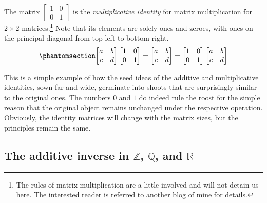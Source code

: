 \documentclass[
  a4paper,
]{article}
\begin{document}
The matrix \(\begin{bmatrix}1 & 0\\0 & 1\end{bmatrix}\) is the
\emph{multiplicative identity} for matrix multiplication for
\(2 \times 2\) matrices.\footnote{The rules of matrix multiplication are
  a little involved and will not detain us here. The interested reader
  is referred to another blog of mine for details.} Note that its
elements are solely ones and zeroes, with ones on the principal-diagonal
from top left to bottom right.
\begin{equation}\phantomsection\label{eq:matmultident}{
\begin{bmatrix}
a & b\\
c & d
\end{bmatrix}
\begin{bmatrix}
1 & 0\\
0 & 1
\end{bmatrix}
= %
\begin{bmatrix}
a & b\\
c & d
\end{bmatrix}
=
\begin{bmatrix}
1 & 0\\
0 & 1
\end{bmatrix}
\begin{bmatrix}
a & b\\
c & d
\end{bmatrix}
}\end{equation}

This is a simple example of how the seed ideas of the additive and
multiplicative identities, sown far and wide, germinate into shoots that
are surprisingly similar to the original ones. The numbers \(0\) and
\(1\) do indeed rule the roost for the simple reason that the original
object remains unchanged under the respective operation. Obviously, the
identity matrices will change with the matrix sizes, but the principles
remain the same.

\subsection{\texorpdfstring{The additive inverse in \(\mathbb{Z}\),
\(\mathbb{Q}\), and
\(\mathbb{R}\)}{The additive inverse in \textbackslash mathbb\{Z\}, \textbackslash mathbb\{Q\}, and \textbackslash mathbb\{R\}}}\label{the-additive-inverse-in-mathbbz-mathbbq-and-mathbbr}
\end{document}
